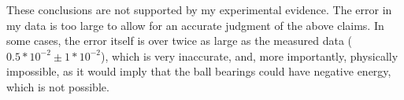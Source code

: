 \documentclass[aip,jmp,amsmath,amssymb,reprint,author-numerical]{revtex4-1}
\begin{document}
        These conclusions are not supported by my experimental evidence. The error in my data is too
        large to allow for an accurate judgment of the above claims. In some cases, the error itself
        is over twice as large as the measured data ($0.5*10^{-2}\pm 1*10^{-2}$), which is very
        inaccurate, and, more importantly, physically impossible, as it would imply that the ball bearings
        could have negative energy, which is not possible.
\end{document}
